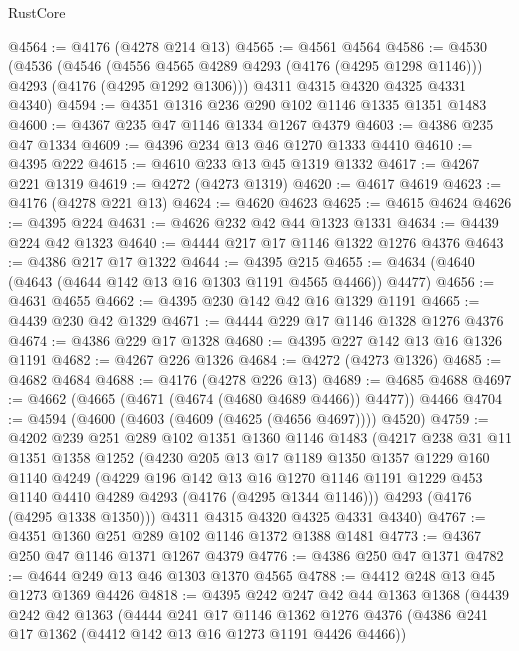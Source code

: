 \begin{lexlean}{RustCore}
\begin{coremodule}
@4564 := @4176 (@4278 @214 @13)
@4565 := @4561 @4564
@4586 := @4530
    (@4536
      (@4546
        (@4556 @4565 @4289 @4293 (@4176 (@4295 @1298 @1146)))
        @4293
        (@4176 (@4295 @1292 @1306)))
      @4311
      @4315
      @4320
      @4325
      @4331
      @4340)
@4594 := @4351 @1316 @236 @290 @102 @1146 @1335 @1351 @1483
@4600 := @4367 @235 @47 @1146 @1334 @1267 @4379
@4603 := @4386 @235 @47 @1334
@4609 := @4396 @234 @13 @46 @1270 @1333 @4410
@4610 := @4395 @222
@4615 := @4610 @233 @13 @45 @1319 @1332
@4617 := @4267 @221 @1319
@4619 := @4272 (@4273 @1319)
@4620 := @4617 @4619
@4623 := @4176 (@4278 @221 @13)
@4624 := @4620 @4623
@4625 := @4615 @4624
@4626 := @4395 @224
@4631 := @4626 @232 @42 @44 @1323 @1331
@4634 := @4439 @224 @42 @1323
@4640 := @4444 @217 @17 @1146 @1322 @1276 @4376
@4643 := @4386 @217 @17 @1322
@4644 := @4395 @215
@4655 := @4634 (@4640 (@4643 (@4644 @142 @13 @16 @1303 @1191 @4565 @4466)) @4477)
@4656 := @4631 @4655
@4662 := @4395 @230 @142 @42 @16 @1329 @1191
@4665 := @4439 @230 @42 @1329
@4671 := @4444 @229 @17 @1146 @1328 @1276 @4376
@4674 := @4386 @229 @17 @1328
@4680 := @4395 @227 @142 @13 @16 @1326 @1191
@4682 := @4267 @226 @1326
@4684 := @4272 (@4273 @1326)
@4685 := @4682 @4684
@4688 := @4176 (@4278 @226 @13)
@4689 := @4685 @4688
@4697 := @4662 (@4665 (@4671 (@4674 (@4680 @4689 @4466)) @4477)) @4466
@4704 := @4594 (@4600 (@4603 (@4609 (@4625 (@4656 @4697)))) @4520)
@4759 := @4202
    @239
    @251
    @289
    @102
    @1351
    @1360
    @1146
    @1483
    (@4217
      @238
      @31
      @11
      @1351
      @1358
      @1252
      (@4230
        @205
        @13
        @17
        @1189
        @1350
        @1357
        @1229
        @160
        @1140
        @4249
        (@4229
          @196
          @142
          @13
          @16
          @1270
          @1146
          @1191
          @1229
          @453
          @1140
          @4410
          @4289
          @4293
          (@4176 (@4295 @1344 @1146)))
        @4293
        (@4176 (@4295 @1338 @1350)))
      @4311
      @4315
      @4320
      @4325
      @4331
      @4340)
@4767 := @4351 @1360 @251 @289 @102 @1146 @1372 @1388 @1481
@4773 := @4367 @250 @47 @1146 @1371 @1267 @4379
@4776 := @4386 @250 @47 @1371
@4782 := @4644 @249 @13 @46 @1303 @1370 @4565
@4788 := @4412 @248 @13 @45 @1273 @1369 @4426
@4818 := @4395
    @242
    @247
    @42
    @44
    @1363
    @1368
    (@4439
      @242
      @42
      @1363
      (@4444
        @241
        @17
        @1146
        @1362
        @1276
        @4376
        (@4386 @241 @17 @1362 (@4412 @142 @13 @16 @1273 @1191 @4426 @4466))

\end{coremodule}
\end{lexlean}
